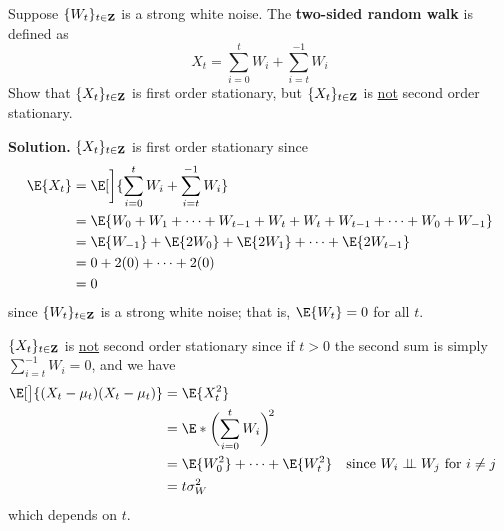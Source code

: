 \begin{Exercise}{}{}
    Suppose $ \{W_t\}_{t\in\mathbf{Z}} $ is a strong white noise.
    The \textbf{two-sided random walk} is defined as
    \[ X_t=\sum_{i=0}^{t} W_i+\sum_{i=t}^{-1} W_i  \]
    Show that $ \{X_t\}_{t\in\mathbf{Z}} $ is first order stationary,
    but $ \{X_t\}_{t\in\mathbf{Z}} $ is \underline{not} second order stationary.

    \textbf{Solution.} $ \{X_t\}_{t\in\mathbf{Z}} $ is first order stationary
    since
    \begin{align*}
        \E{X_t}
         & =\E[\bigg]{\sum_{i=0}^{t}W_i+\sum_{i=t}^{-1} W_i}                   \\
         & =\E{W_0+W_1+\cdots+W_{t-1}+W_{t}+W_{t}+W_{t-1}+\cdots+W_{0}+W_{-1}} \\
         & =\E{W_{-1}}+\E{2W_0}+\E{2W_1}+\cdots+\E{2W_{t-1}}                   \\
         & =0+2(0)+\cdots+2(0)                                                 \\
         & =0
    \end{align*}
    since $ \{W_t\}_{t\in\mathbf{Z}} $ is a strong white noise; that is,
    $ \E{W_t}=0 $ for all $ t $.

    $ \{X_t\}_{t\in\mathbf{Z}} $ is \underline{not} second order stationary
    since if $ t>0 $ the second sum is simply $ \sum_{i=t}^{-1} W_i=0 $, and we have
    \begin{align*}
        \E[\big]{(X_t-\mu_t)(X_t-\mu_t)}
         & =\E{X_t^2}                                                                                      \\
         & =\E*{\biggl(\sum_{i=0}^{t} W_i\biggr)^{\!2}}                                                    \\
         & =\E{W_0^2}+\cdots+\E{W_t^2}                  &  & \text{since $ W_i\indep W_j $ for $ i\ne j $} \\
         & =t\sigma_W^2
    \end{align*}
    which depends on $ t $.
\end{Exercise}
